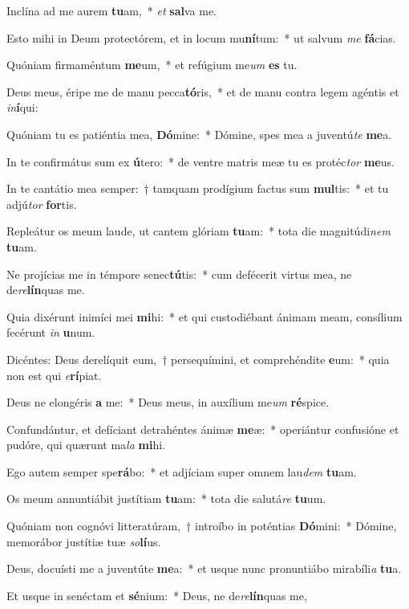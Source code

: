 \item Inclína ad me aurem \textbf{tu}am,~* \textit{et} \textbf{sal}va me.
\item Esto mihi in Deum protectórem, et in locum mu\textbf{ní}tum:~* ut salvum \textit{me} \textbf{fá}cias.
\item Quóniam firmaméntum \textbf{me}um,~* et refúgium me\textit{um} \textbf{es} tu.
\item Deus meus, éripe me de manu pecca\textbf{tó}ris,~* et de manu contra legem agéntis et \textit{in}\textbf{í}qui:
\item Quóniam tu es patiéntia mea, \textbf{Dó}mine:~* Dómine, spes mea a juventú\textit{te} \textbf{me}a.
\item In te confirmátus sum ex \textbf{ú}tero:~* de ventre matris meæ tu es protéc\textit{tor} \textbf{me}us.
\item In te cantátio mea semper:~† tamquam prodígium factus sum \textbf{mul}tis:~* et tu adjú\textit{tor} \textbf{for}tis.
\item Repleátur os meum laude, ut cantem glóriam \textbf{tu}am:~* tota die magnitúdi\textit{nem} \textbf{tu}am.
\item Ne projícias me in témpore senec\textbf{tú}tis:~* cum defécerit virtus mea, ne de\textit{re}\textbf{lín}quas me.
\item Quia dixérunt inimíci mei \textbf{mi}hi:~* et qui custodiébant ánimam meam, consílium fecérunt \textit{in} \textbf{u}num.
\item Dicéntes: Deus derelíquit eum,~† persequímini, et comprehéndite \textbf{e}um:~* quia non est qui \textit{e}\textbf{rí}piat.
\item Deus ne elongéris \textbf{a} me:~* Deus meus, in auxílium me\textit{um} \textbf{ré}spice.
\item Confundántur, et defíciant detrahéntes ánimæ \textbf{me}æ:~* operiántur confusióne et pudóre, qui quærunt ma\textit{la} \textbf{mi}hi.
\item Ego autem semper spe\textbf{rá}bo:~* et adjíciam super omnem lau\textit{dem} \textbf{tu}am.
\item Os meum annuntiábit justítiam \textbf{tu}am:~* tota die salutá\textit{re} \textbf{tu}um.
\item Quóniam non cognóvi litteratúram,~† introíbo in poténtias \textbf{Dó}mini:~* Dómine, memorábor justítiæ tuæ \textit{so}\textbf{lí}us.
\item Deus, docuísti me a juventúte \textbf{me}a:~* et usque nunc pronuntiábo mirabíli\textit{a} \textbf{tu}a.
\item Et usque in senéctam et \textbf{sé}nium:~* Deus, ne de\textit{re}\textbf{lín}quas me,
